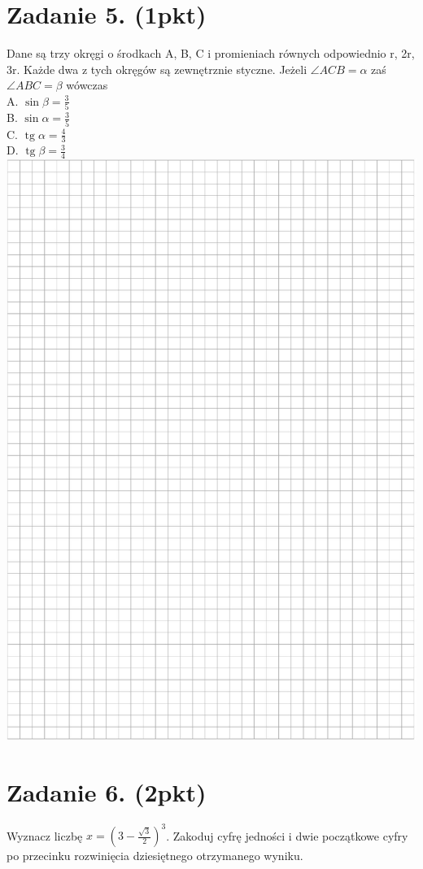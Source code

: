 \documentclass[10pt]{article}
\begin{document}
\section*{Zadanie 5. (1pkt)}
Dane są trzy okręgi o środkach A, B, C i promieniach równych odpowiednio r, 2r, 3r. Każde dwa z tych okręgów są zewnętrznie styczne. Jeżeli \(\angle A C B=\alpha\) zaś \(\angle A B C=\beta\) wówczas\\
A. \(\sin \beta=\frac{3}{5}\)\\
B. \(\sin \alpha=\frac{3}{5}\)\\
C. \(\operatorname{tg} \alpha=\frac{4}{3}\)\\
D. \(\operatorname{tg} \beta=\frac{3}{4}\)\\
\includegraphics[max width=\textwidth, center]{2024_11_21_439e1d90cd1e7f928ae2g-03}

\section*{Zadanie 6. (2pkt)}
Wyznacz liczbę \(x=\left(3-\frac{\sqrt{3}}{2}\right)^{3}\). Zakoduj cyfrę jedności i dwie początkowe cyfry po przecinku rozwinięcia dziesiętnego otrzymanego wyniku.
\end{document}
